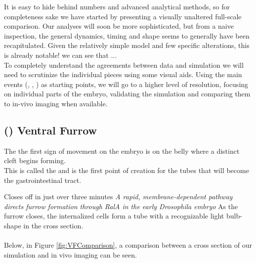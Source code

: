 It is easy to hide behind numbers and advanced analytical methods, so for completeness sake we have started by presenting a visually unaltered full-scale comparison. Our analyses will soon be more sophisticated, but from a naive inspection, the general dynamics, timing and shape seems to generally have been recapitulated. Given the relatively simple model and few specific alterations, this is already notable! we can see that ... \\ 


To completely understand the agreements between data and simulation we will need to scrutinize the individual pieces using some visual aids. Using the main events (, , ) as starting points, we will go to a higher level of resolution, focusing on individual parts of the embryo, validating the simulation and comparing them to in-vivo imaging when available.


\subsection{() Ventral Furrow }
The the first sign of movement on the embryo is on the belly where a distinct cleft begins forming. \\
This is called the  and is the first point of creation for the tubes that will become the gastrointestinal tract.

Closes off in just over three minutes
\textit{A rapid, membrane-dependent pathway directs furrow formation through RalA in the early Drosophila embryo}
As the furrow closes, the internalized cells form a tube with a recognizable light bulb-shape in the cross section. \\
\\


Below, in Figure \ref{fig:VFComparison}, a comparison between a cross section of our simulation and in vivo imaging can be seen.


